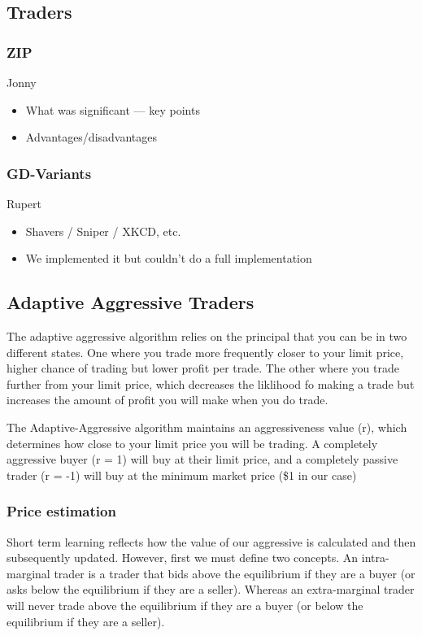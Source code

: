 \documentclass[12pt]{article} %
\begin{document}
\subsection{Traders}
\subsubsection{ZIP}
Jonny
\begin{itemize} \itemsep0pt
	\item What was significant --- key points
	\item Advantages/disadvantages
\end{itemize}

\subsubsection{GD-Variants}
Rupert
\begin{itemize} \itemsep0pt
	\item Shavers / Sniper / XKCD, etc.
	\item We implemented it but couldn't do a full implementation
\end{itemize}

\pagebreak
\subsection{Adaptive Aggressive Traders}
The adaptive aggressive algorithm relies on the principal that you can be in
two different states. One where you trade more frequently closer to your limit
price, higher chance of trading but lower profit per trade. The other where you
trade further from your limit price, which decreases the liklihood fo making a
trade but increases the amount of profit you will make when you do trade.

The Adaptive-Aggressive algorithm maintains an aggressiveness value (r), which
determines how close to your limit price you will be trading. A completely
aggressive buyer (r = 1) will buy at their limit price, and a completely
passive trader (r = -1) will buy at the minimum market price (\$1 in our case)

\subsubsection{Price estimation}
Short term learning reflects how the value of our aggressive is calculated and
then subsequently updated. However, first we must define two concepts. An
intra-marginal trader is a trader that bids above the equilibrium if they are a
buyer (or asks below the equilibrium if they are a seller). Whereas an
extra-marginal trader will never trade above the equilibrium if they are a
buyer (or below the equilibrium if they are a seller).
\end{document}
